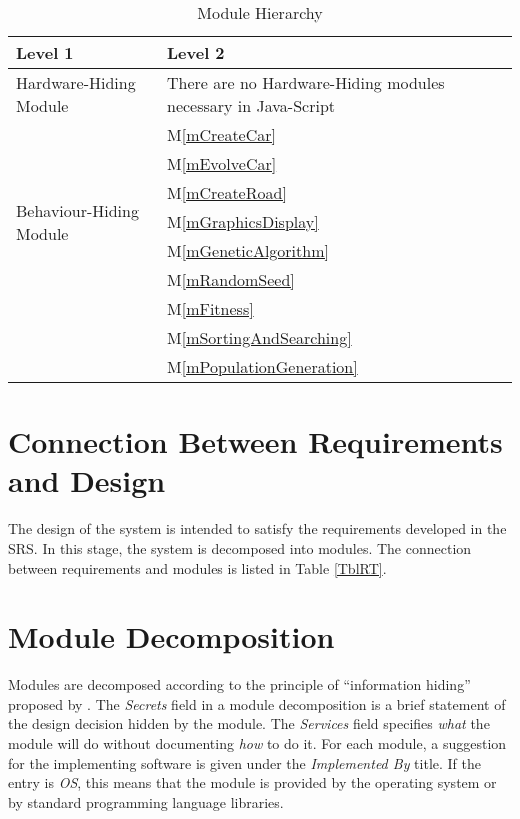\documentclass[12pt, titlepage]{article}
\newcommand{\mref}[1]{M\ref{#1}}
\begin{document}
\begin{table}[h!]
\centering
\begin{tabular}{p{} p{}}
\toprule
\textbf{Level 1} & \textbf{Level 2}\\
\midrule

{Hardware-Hiding Module} & There are no Hardware-Hiding modules necessary in Java-Script \\
\midrule

\multirow{7}{0.3\textwidth}{Behaviour-Hiding Module}
& \mref{mCreateCar}\\
& \mref{mEvolveCar}\\
& \mref{mCreateRoad}\\
& \mref{mGraphicsDisplay}\\
& \mref{mGeneticAlgorithm}\\
\midrule

\multirow{3}{0.3\textwidth}{Software Decision Module} 
& \mref{mRandomSeed}\\
& \mref{mFitness}\\
& \mref{mSortingAndSearching}\\
& \mref{mPopulationGeneration}\\

\bottomrule

\end{tabular}
\caption{Module Hierarchy}
\label{TblMH}
\end{table}

\section{Connection Between Requirements and Design} \label{SecConnection}

The design of the system is intended to satisfy the requirements developed in
the SRS. In this stage, the system is decomposed into modules. The connection
between requirements and modules is listed in Table \ref{TblRT}.

\section{Module Decomposition} \label{SecMD}

Modules are decomposed according to the principle of ``information hiding''
proposed by \citet{ParnasEtAl1984}. The \emph{Secrets} field in a module
decomposition is a brief statement of the design decision hidden by the
module. The \emph{Services} field specifies \emph{what} the module will do
without documenting \emph{how} to do it. For each module, a suggestion for the
implementing software is given under the \emph{Implemented By} title. If the
entry is \emph{OS}, this means that the module is provided by the operating
system or by standard programming language libraries. 
\end{document}
